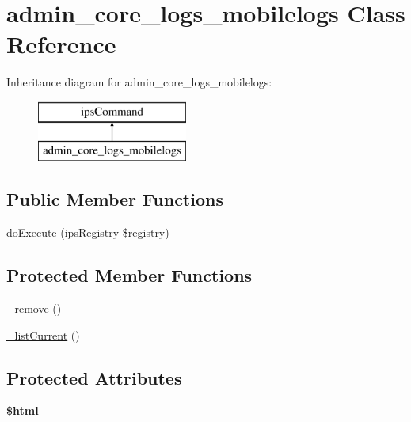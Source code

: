 \hypertarget{classadmin__core__logs__mobilelogs}{\section{admin\-\_\-core\-\_\-logs\-\_\-mobilelogs Class Reference}
\label{classadmin__core__logs__mobilelogs}
}
Inheritance diagram for admin\-\_\-core\-\_\-logs\-\_\-mobilelogs\-:\begin{figure}[H]
\begin{center}
\leavevmode
\includegraphics[height=2.000000cm]{classadmin__core__logs__mobilelogs}
\end{center}
\end{figure}
\subsection*{Public Member Functions}
\begin{DoxyCompactItemize}
\item 
\hyperlink{classadmin__core__logs__mobilelogs_afbc4e912a0604b94d47d66744c64d8ba}{do\-Execute} (\hyperlink{classips_registry}{ips\-Registry} \$registry)
\end{DoxyCompactItemize}
\subsection*{Protected Member Functions}
\begin{DoxyCompactItemize}
\item 
\hyperlink{classadmin__core__logs__mobilelogs_a6e3a0c448dcfd8610c6ddf42c6c660aa}{\-\_\-remove} ()
\item 
\hyperlink{classadmin__core__logs__mobilelogs_abc03e9ca0857dea04554a012ac374f5a}{\-\_\-list\-Current} ()
\end{DoxyCompactItemize}
\subsection*{Protected Attributes}
\begin{DoxyCompactItemize}
\item 
\hypertarget{classadmin__core__logs__mobilelogs_a6f96e7fc92441776c9d1cd3386663b40}{{\bfseries \$html}}\label{classadmin__core__logs__mobilelogs_a6f96e7fc92441776c9d1cd3386663b40}

\end{DoxyCompactItemize}
